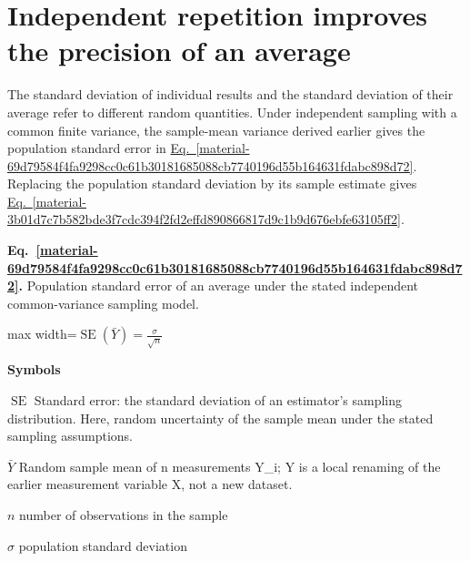 \documentclass[11pt,a4paper]{article}
\begin{document}
\clearpage
\section{Independent repetition improves the precision of an average}
The standard deviation of individual results and the standard deviation of their average refer to different random quantities. Under independent sampling with a common finite variance, the sample-mean variance derived earlier gives the population standard error in \hyperref[material-69d79584f4fa9298cc0c61b30181685088cb7740196d55b164631fdabc898d72]{Eq.~\ref*{material-69d79584f4fa9298cc0c61b30181685088cb7740196d55b164631fdabc898d72}}. Replacing the population standard deviation by its sample estimate gives \hyperref[material-3b01d7c7b582bde3f7cdc394f2fd2effd890866817d9c1b9d676ebfe63105ff2]{Eq.~\ref*{material-3b01d7c7b582bde3f7cdc394f2fd2effd890866817d9c1b9d676ebfe63105ff2}}.


\par\medskip
\begin{samepage}
\label{material-69d79584f4fa9298cc0c61b30181685088cb7740196d55b164631fdabc898d72}
\noindent\textbf{Eq.~\ref*{material-69d79584f4fa9298cc0c61b30181685088cb7740196d55b164631fdabc898d72}.} Population standard error of an average under the stated independent common-variance sampling model.\par\nopagebreak
\begin{center}\begin{adjustbox}{max width=\linewidth}$\displaystyle \operatorname{SE}(\bar Y)=\frac{\sigma}{\sqrt n}$\end{adjustbox}\end{center}

\par\noindent\textbf{Symbols}

\par\noindent\textbf{\(\operatorname{SE}\)} Standard error: the standard deviation of an estimator's sampling distribution. Here, random uncertainty of the sample mean under the stated sampling assumptions.

\par\noindent\textbf{\(\bar Y\)} Random sample mean of n measurements Y\_i; Y is a local renaming of the earlier measurement variable X, not a new dataset.

\par\noindent\textbf{\(n\)} number of observations in the sample

\par\noindent\textbf{\(σ\)} population standard deviation

\end{samepage}
\medskip
\end{document}
